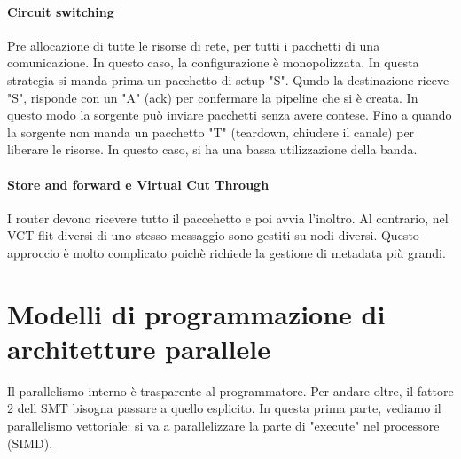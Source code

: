 \documentclass{article}
\begin{document}
\paragraph{Circuit switching}
Pre allocazione di tutte le risorse di rete, per tutti i pacchetti di una comunicazione. In questo caso, la configurazione è monopolizzata.
In questa strategia si manda prima un pacchetto di setup "S". Qundo la destinazione riceve "S", risponde con un "A" (ack) per confermare la pipeline che si è creata. In questo modo la sorgente può inviare pacchetti senza avere contese. Fino a quando la sorgente non manda un pacchetto "T" (teardown, chiudere il canale) per liberare le risorse. In questo caso, si ha una bassa utilizzazione della banda.

\paragraph{Store and forward e Virtual Cut Through}
I router devono ricevere tutto il paccehetto e poi avvia l'inoltro. Al contrario, nel VCT flit diversi di uno stesso messaggio sono gestiti su nodi diversi. Questo approccio è molto complicato poichè richiede la gestione di metadata più grandi.

\newpage
\section{Modelli di programmazione di architetture parallele}
Il parallelismo interno è trasparente al programmatore. Per andare oltre, il fattore 2 dell SMT bisogna passare a quello esplicito. In questa prima parte, vediamo il parallelismo vettoriale: si va a parallelizzare la parte di "execute" nel processore (SIMD).
\end{document}
